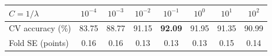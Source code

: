 \begin{tabular}{lccccccc}
\toprule
$C = 1/\lambda$ & $10^{-4}$ & $10^{-3}$ & $10^{-2}$ & $10^{-1}$ & $10^{0}$ & $10^{1}$ & $10^{2}$ \\
\midrule
CV accuracy (\%) & 83.75 & 88.77 & 91.15 & \textbf{92.09} & 91.95 & 91.35 & 90.99 \\
Fold SE (points) & 0.16 & 0.16 & 0.13 & 0.13 & 0.13 & 0.15 & 0.14 \\
\bottomrule
\end{tabular}
